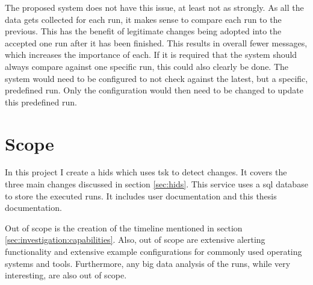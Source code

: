 The proposed system does not have this issue, at least not as strongly. As all the data gets collected for each run, it makes sense to compare each run to the previous. This has the benefit of legitimate changes being adopted into the accepted one run after it has been finished. This results in overall fewer messages, which increases the importance of each. If it is required that the system should always compare against one specific run, this could also clearly be done. The system would need to be configured to not check against the latest, but a specific, predefined run. Only the configuration would then need to be changed to update this predefined run. 

\section{Scope}

In this project I create a \gls{hids} which uses \gls{tsk} to detect changes. It covers the three main changes discussed in section \ref{sec:hids}. This service uses a \gls{sql} database to store the executed runs. It includes user documentation and this thesis documentation. 

Out of scope is the creation of the timeline mentioned in section \ref{sec:investigation:capabilities}. Also, out of scope are extensive alerting functionality and extensive example configurations for commonly used operating systems and tools. Furthermore, any big data analysis of the runs, while very interesting, are also out of scope.

